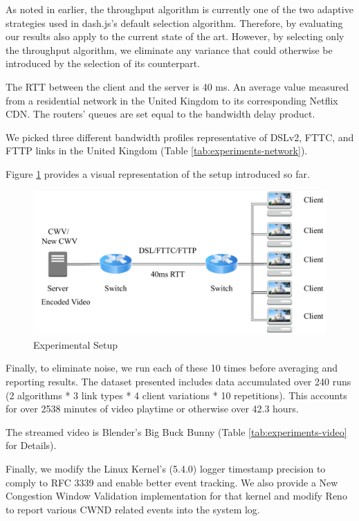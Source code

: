 \documentclass[10pt,sigconf]{acmart}
\begin{document}
As noted in earlier, the throughput algorithm is currently one of the two adaptive strategies used in dash.js's default selection algorithm. Therefore, by evaluating our results also apply to the current state of the art. However, by selecting only the throughput algorithm, we eliminate any variance that could otherwise be introduced by the selection of its counterpart. 

The RTT between the client and the server is 40 ms. An average value measured from a residential network in the United Kingdom to its corresponding Netflix CDN. The routers' queues are set equal to the bandwidth delay product.

We picked three different bandwidth profiles representative of DSLv2, FTTC, and FTTP links in the United Kingdom \cite{online-ofcom-report} (Table \ref{tab:experiments-network}).

Figure \ref{fig:experimental-setup} provides a visual representation of the setup introduced so far.

\begin{figure}
  \centering
  \includegraphics[width=.5\textwidth]{figures/setup.pdf}
  \caption{Experimental Setup}
  \label{fig:experimental-setup}
\end{figure}

Finally, to eliminate noise, we run each of these 10 times before averaging and reporting results. The dataset presented includes data accumulated over 240 runs (2 algorithms * 3 link types * 4 client variations * 10 repetitions). This accounts for over 2538 minutes of video playtime or otherwise over 42.3 hours.



The streamed video is Blender's Big Buck Bunny \cite{online-bbb} (Table \ref{tab:experiments-video} for Details).

Finally, we modify the Linux Kernel's (5.4.0) logger timestamp precision to comply to RFC 3339 and enable better event tracking. We also provide a New Congestion Window Validation \cite{rfc7661-2015-fairhurst-new-cwnd-validation} implementation for that kernel and modify Reno to report various CWND related events into the system log.
\end{document}
